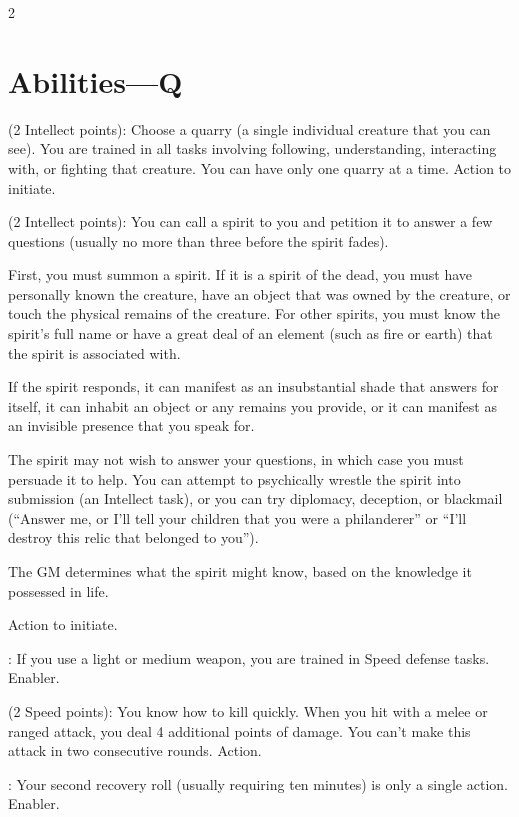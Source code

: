 \begin{multicols}{2}

\section{Abilities—Q}

 (2 Intellect points): Choose a quarry (a single individual creature that you can see). You are trained in all tasks involving following, understanding, interacting with, or fighting that creature. You can have only one quarry at a time. Action to initiate. 
 
 (2 Intellect points): You can call a spirit to you and petition it to answer a few questions (usually no more than three before the spirit fades). 

First, you must summon a spirit. If it is a spirit of the dead, you must have personally known the creature, have an object that was owned by
the creature, or touch the physical remains of the creature. For other spirits, you must know the spirit’s full name or have a great deal of an element (such as fire or earth) that the spirit is associated with. 

If the spirit responds, it can manifest as an insubstantial shade that answers for itself, it can inhabit an object or any remains you provide, or it can manifest as an invisible presence that you speak for. 

The spirit may not wish to answer your questions, in which case you must persuade it to help. You can attempt to psychically wrestle the spirit into submission (an Intellect task), or you can try diplomacy, deception, or blackmail (“Answer me, or I’ll tell your children that you were a philanderer” or “I’ll destroy this relic that belonged to you”). 

The GM determines what the spirit might know, based on the knowledge it possessed in life. 

Action to initiate. 
 
: If you use a light or medium weapon, you are trained in Speed defense tasks. Enabler. 
 
 (2 Speed points): You know how to kill quickly. When you hit with a melee or ranged attack, you deal 4 additional points of damage. You can’t make this attack in two consecutive rounds. Action. 
 
: Your second recovery roll (usually requiring ten minutes) is only a single action. Enabler. 
 

\end{multicols}

